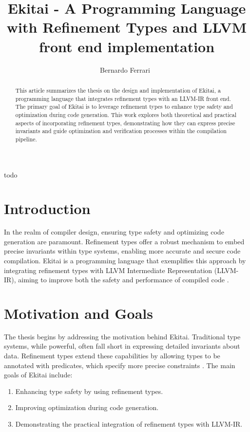 \documentclass[12pt]{article}
\title{Ekitai - A Programming Language with Refinement Types and LLVM front end implementation}
\author{
	Bernardo Ferrari~\inst{1}
}
\begin{document}
 

\maketitle

\begin{abstract}
  This article summarizes the thesis on the design and implementation of Ekitai, a programming language that integrates refinement types with an LLVM-IR front end.
  The primary goal of Ekitai is to leverage refinement types to enhance type safety and optimization during code generation.
  This work explores both theoretical and practical aspects of incorporating refinement types, demonstrating how they can express precise invariants and guide optimization and verification processes within the compilation pipeline.
\end{abstract}
     
\begin{resumo} 
  todo
\end{resumo}

\section{Introduction}

In the realm of compiler design, ensuring type safety and optimizing code generation are paramount. Refinement types offer a robust mechanism to embed precise invariants within type systems, enabling more accurate and secure code compilation. Ekitai is a programming language that exemplifies this approach by integrating refinement types with LLVM Intermediate Representation (LLVM-IR), aiming to improve both the safety and performance of compiled code \cite{aho2006}.

\section{Motivation and Goals}

The thesis begins by addressing the motivation behind Ekitai. Traditional type systems, while powerful, often fall short in expressing detailed invariants about data. Refinement types extend these capabilities by allowing types to be annotated with predicates, which specify more precise constraints \cite{jhala2020}. The main goals of Ekitai include:
\begin{enumerate}
    \item Enhancing type safety by using refinement types.
    \item Improving optimization during code generation.
    \item Demonstrating the practical integration of refinement types with LLVM-IR.
\end{enumerate}
\end{document}
